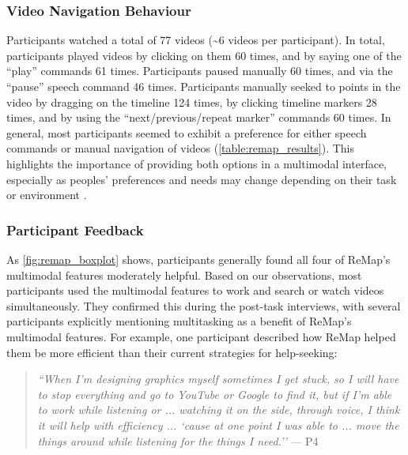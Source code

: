 \subsubsection{Video Navigation Behaviour}
Participants watched a total of 77 videos (\textasciitilde6 videos per participant). In total, participants played videos by clicking on them 60 times, and by saying one of the ``play'' commands 61 times. Participants paused manually 60 times, and via the ``pause'' speech command 46 times. Participants manually seeked to points in the video by dragging on the timeline 124 times, by clicking timeline markers 28 times, and by using the ``next/previous/repeat marker'' commands 60 times. In general, most participants seemed to exhibit a preference for either speech commands or manual navigation of videos (\autoref{table:remap_results}). This highlights the importance of providing both options in a multimodal interface, especially as peoples' preferences and needs may change depending on their task or environment \cite{Reeves2004, LaViolaJr.2014}.

\subsubsection{Participant Feedback}
As \autoref{fig:remap_boxplot} shows, participants generally found all four of ReMap's multimodal features moderately helpful. Based on our observations, most participants used the multimodal features to work and search or watch videos simultaneously. They confirmed this during the post-task interviews, with several participants explicitly mentioning multitasking as a benefit of ReMap's multimodal features. For example, one participant described how ReMap helped them be more efficient than their current strategies for help-seeking:

\begin{quote}
\textit{``When I'm designing graphics myself sometimes I get stuck, so I will have to stop everything and go to YouTube or Google to find it, but if I'm able to work while listening or ... watching it on the side, through voice, I think it will help with efficiency ... `cause at one point I was able to ... move the things around while listening for the things I need.''} --- P4
\end{quote}

